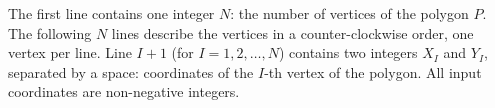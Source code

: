 The first line contains one integer $N$: the number of vertices of the polygon $P$. The following $N$ lines describe the vertices in a counter-clockwise order, one vertex per line. Line $I+1$ (for $I = 1, 2, \ldots, N$) contains two integers $X_I$ and $Y_I$, separated by a space: coordinates of the $I$-th vertex of the polygon. All input coordinates are non-negative integers.